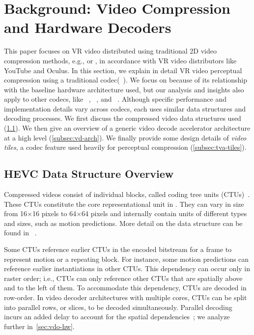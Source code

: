 \section{Background: Video Compression and Hardware Decoders}
\vdecBaselineArchFigure

This paper focuses on VR video distributed using traditional 2D video compression methods, e.g., \hevc or \vpnine, in accordance with VR video distributors like YouTube and Oculus.
In this section, we explain in detail VR video perceptual compression using a traditional codec(\hevc~\cite{hevc}).
We focus on \hevc because of its relationship with the baseline hardware architecture used, but our analysis and insights also apply to other codecs, like \vpnine~\cite{mukherjee2015technical}, \avc~\cite{h264spec}, and \avone~\cite{avone}.
Although specific performance and implementation details vary across codecs, each uses similar data structures and decoding processes.
We first discuss the compressed video data structures used (\ref{subsec:tva-hevc}).
We then give an overview of a generic video decode accelerator architecture at a high level (\ref{subsec:vd-arch}).
We finally provide some design details of \emph{video tiles}, a codec feature used heavily for perceptual compression (\ref{subsec:tva-tiles}).

\subsection{HEVC Data Structure Overview}
\label{subsec:tva-hevc}

Compressed \hevc videos consist of individual blocks, called coding tree units (CTUs)~\cite{hevc}.
These CTUs constitute the core representational unit in \hevc.
They can vary in size from 16$\times$16 pixels to 64$\times$64 pixels and internally contain units of different types and sizes, such as motion predictions.
More detail on the \hevc data structure can be found in ~\cite{hevc}.

Some CTUs reference earlier CTUs in the encoded bitstream for a frame to represent motion or a repeating block.
For instance, some motion predictions can reference earlier instantiations in other CTUs.
This dependency can occur only in raster order; i.e., CTUs can only reference other CTUs that are spatially above and to the left of them.
To accommodate this dependency, CTUs are decoded in row-order.
In video decoder architectures with multiple cores, CTUs can be split into parallel rows, or slices, to be decoded simultaneously.
Parallel decoding incurs an added delay to account for the spatial dependencies~\cite{hevcThesis}; we analyze further in~\ref{sec:vdo-hw}.

